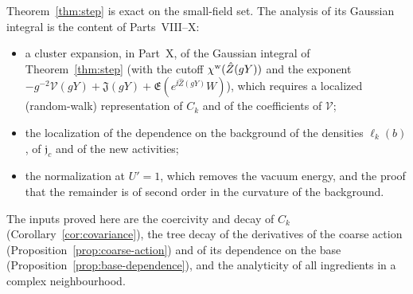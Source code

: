 \begin{remark}
Theorem~\ref{thm:step} is exact on the small-field set. The analysis of its Gaussian integral is the content of Parts~VIII--X:
\begin{itemize}
\item a cluster expansion, in Part~X, of the Gaussian integral of Theorem~\ref{thm:step} (with the cutoff $\chi^{\rm w}(\hat Z(gY))$ and the exponent $-g^{-2}\mathcal V(gY)+\mathfrak J(gY)+\mathfrak E(e^{\ii\hat Z(gY)}W)$), which requires a localized (random-walk) representation of $C_k$ and of the coefficients of $\mathcal V$;
\item the localization of the dependence on the background of the densities $\ell_k(b)$, of $\mathfrak j_c$ and of the new activities;
\item the normalization at $U'=1$, which removes the vacuum energy, and the proof that the remainder is of second order in the curvature of the background.
\end{itemize}
The inputs proved here are the coercivity and decay of $C_k$ (Corollary~\ref{cor:covariance}), the tree decay of the derivatives of the coarse action (Proposition~\ref{prop:coarse-action}) and of its dependence on the base (Proposition~\ref{prop:base-dependence}), and the analyticity of all ingredients in a complex neighbourhood.
\end{remark}

